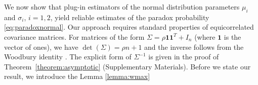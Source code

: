 \documentclass[12pt]{article}
\begin{document}
We now show that plug-in estimators of the normal distribution parameters $\mu_i$ and $\sigma_i$, $i=1,2$, yield reliable estimates of the paradox probability \eqref{eq:paradoxnormal}. Our approach requires standard properties of equicorrelated covariance matrices. 
For matrices of the form $\Sigma = \rho \mathbf{1}\mathbf{1}^T + I_n$ (where 
$\mathbf{1}$ is the vector of ones), we have $\det(\Sigma) = \rho n + 1$ and the 
inverse follows from the Woodbury identity \citep{golub2013matrix}. The explicit 
form of $\Sigma^{-1}$ is given in the proof of Theorem~\ref{theorem:asymptotic} 
(Supplementary Materials).
Before we state our result, we introduce the Lemma \ref{lemma:wmax}
\end{document}
